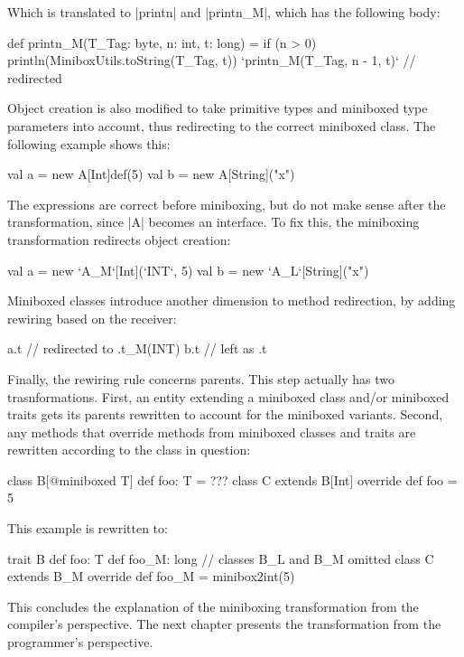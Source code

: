 Which is translated to |printn| and |printn_M|, which has the following body:

\begin{lstlisting-nobreak}
 def printn_M(T_Tag: byte, n: int, t: long) =
   if (n > 0) {
     println(MiniboxUtils.toString(T_Tag, t))
     `printn_M(T_Tag, n - 1, t)` // redirected
   }
\end{lstlisting-nobreak}

Object creation is also modified to take primitive types and miniboxed type parameters into account, thus redirecting to the correct miniboxed class. The following example shows this:

\begin{lstlisting-nobreak}
 val a = new A[Int]def(5)
 val b = new A[String]("x")
\end{lstlisting-nobreak}

The expressions are correct before miniboxing, but do not make sense after the transformation, since |A| becomes an interface. To fix this, the miniboxing transformation redirects object creation:

\begin{lstlisting-nobreak}
 val a = new `A_M`[Int](`INT`, 5)
 val b = new `A_L`[String]("x")
\end{lstlisting-nobreak}

Miniboxed classes introduce another dimension to method redirection, by adding rewiring based on the receiver:

\begin{lstlisting-nobreak}
  a.t // redirected to .t_M(INT)
  b.t // left as .t
\end{lstlisting-nobreak}

Finally, the rewiring rule concerns parents. This step actually has two trasnformations. First, an entity extending a miniboxed class and/or miniboxed traits gets its parents rewritten to account for the miniboxed variants. Second, any methods that override methods from miniboxed classes and traits are rewritten according to the class in question:

\begin{lstlisting-nobreak}
  class B[@miniboxed T]   { def foo: T = ??? }
  class C extends B[Int] { override def foo = 5 }
\end{lstlisting-nobreak}

This example is rewritten to:

\begin{lstlisting-nobreak}
  trait B {
    def foo: T
    def foo_M: long
  }
  // classes B_L and B_M omitted
  class C extends B_M {
    override def foo_M = minibox2int(5)
  }
\end{lstlisting-nobreak}

This concludes the explanation of the miniboxing transformation from the compiler's perspective. The next chapter presents the transformation from the programmer's perspective.
